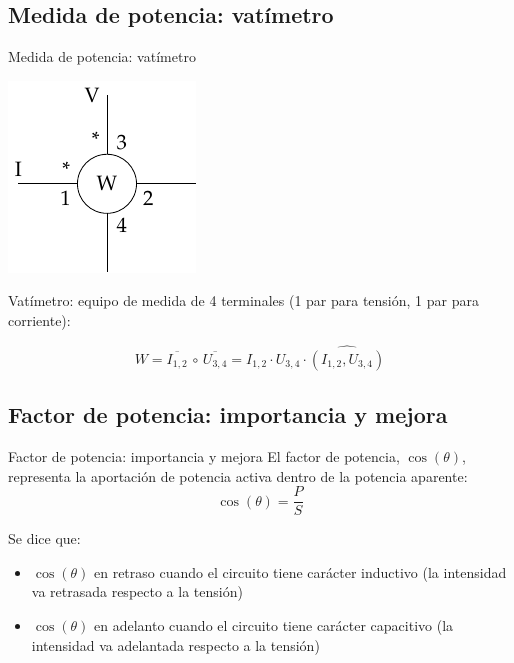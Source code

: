 \documentclass[aspectratio=169, xcolor={usenames,svgnames,dvipsnames}]{beamer}
\begin{document}
\subsection{Medida de potencia: vatímetro}

\begin{frame}{Medida de potencia: vatímetro}
\begin{center}
\includegraphics[height=0.5\textheight]{../figs/vatimetro_2.pdf}
\end{center}

\alert{Vatímetro}: equipo de medida de 4 terminales (1 par para tensión, 1 par para corriente):

\begin{equation*}
	    W=\overline{I_{1,2}}\,\circ\,\overline{U_{3,4}}=I_{1,2}\cdot U_{3,4}\cdot \widehat{(I_{1,2}, U_{3,4})}
	\end{equation*}
\end{frame}




\subsection{Factor de potencia: importancia y mejora}

\begin{frame}{Factor de potencia: importancia y mejora}
El factor de potencia, \(\cos(\theta)\), representa la aportación de potencia activa dentro de la potencia aparente:
\[
\cos (\theta)=\dfrac{P}{S}
\]

Se dice que:
	\begin{itemize}
		\item $\cos(\theta)$ \alert{en retraso} cuando el circuito tiene carácter inductivo (la intensidad va retrasada respecto a la tensión)
		\item $\cos(\theta)$ \alert{en adelanto} cuando el circuito tiene carácter capacitivo (la intensidad va adelantada respecto a la tensión)
	\end{itemize}
	
	\end{frame}
\end{document}
